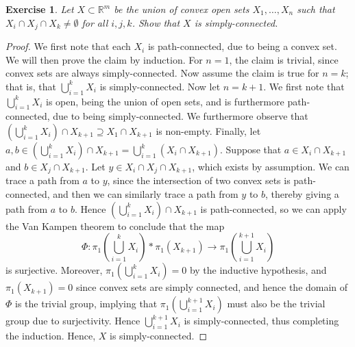 \documentclass{article}
\newtheorem{exercise}{Exercise}[subsection]
\begin{document}
\begin{exercise}
Let $X\subset \mathbb{R}^m$ be the union of convex open sets $X_1,\dots,X_n$ such that $X_i\cap X_j\cap X_k\neq\emptyset$ for all $i,j,k$. Show that $X$ is simply-connected.
\end{exercise}
\begin{proof}
We first note that each $X_i$ is path-connected, due to being a convex set. We will then prove the claim by induction. For $n=1$, the claim is trivial, since convex sets are always simply-connected. Now assume the claim is true for $n=k$; that is, that $\bigcup_{i=1}^kX_i$ is simply-connected. Now let $n=k+1$. We first note that $\bigcup_{i=1}^kX_i$ is open, being the union of open sets, and is furthermore path-connected, due to being simply-connected. We furthermore observe that $(\bigcup_{i=1}^kX_i)\cap X_{k+1}\supseteq X_1\cap X_{k+1}$ is non-empty. Finally, let $a,b\in (\bigcup_{i=1}^kX_i)\cap X_{k+1}=\bigcup_{i=1}^k(X_i\cap X_{k+1})$. Suppose that $a\in X_i\cap X_{k+1}$ and $b\in X_j\cap X_{k+1}$. Let $y\in X_i\cap X_j\cap X_{k+1}$, which exists by assumption. We can trace a path from $a$ to $y$, since the intersection of two convex sets is path-connected, and then we can similarly trace a path from $y$ to $b$, thereby giving a path from $a$ to $b$. Hence $(\bigcup_{i=1}^kX_i)\cap X_{k+1}$ is path-connected, so we can apply the Van Kampen theorem to conclude that the map \[\Phi:\pi_1\left(\bigcup_{i=1}^kX_i\right)*\pi_1(X_{k+1})\to\pi_1\left(\bigcup_{i=1}^{k+1}X_i\right)\] is surjective. Moreover, $\pi_1(\bigcup_{i=1}^kX_i)=0$ by the inductive hypothesis, and $\pi_1(X_{k+1})=0$ since convex sets are simply connected, and hence the domain of $\Phi$ is the trivial group, implying that $\pi_1(\bigcup_{i=1}^{k+1}X_i)$ must also be the trivial group due to surjectivity. Hence $\bigcup_{i=1}^{k+1}X_i$ is simply-connected, thus completing the induction. Hence, $X$ is simply-connected.
\end{proof}
\end{document}
